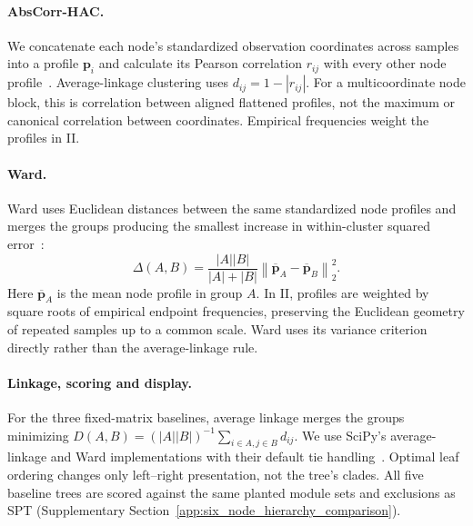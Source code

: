 \documentclass[fleqn,10pt]{wlscirep}
\begin{document}
\paragraph{AbsCorr-HAC.}
\label{app:absolute_correlation}
We concatenate each node's standardized observation coordinates across samples into a profile $\boldsymbol{p}_i$ and calculate its Pearson correlation $r_{ij}$ with every other node profile~\cite{deHoon2004OpenSourceClustering}. Average-linkage clustering uses $d_{ij}=1-|r_{ij}|$. For a multicoordinate node block, this is correlation between aligned flattened profiles, not the maximum or canonical correlation between coordinates. Empirical frequencies weight the profiles in II.


\paragraph{Ward.}
\label{app:ward}
Ward uses Euclidean distances between the same standardized node profiles and merges the groups producing the smallest increase in within-cluster squared error~\cite{Ward1963HierarchicalGrouping}:
\begingroup
\begin{equation}
\Delta(A,B)=\frac{|A||B|}{|A|+|B|}
\left\|\overline{\boldsymbol{p}}_A-\overline{\boldsymbol{p}}_B\right\|_2^2.
\end{equation}
\endgroup
Here $\overline{\boldsymbol{p}}_A$ is the mean node profile in group $A$. In II, profiles are weighted by square roots of empirical endpoint frequencies, preserving the Euclidean geometry of repeated samples up to a common scale. Ward uses its variance criterion directly rather than the average-linkage rule.

\paragraph{Linkage, scoring and display.}
For the three fixed-matrix baselines, average linkage merges the groups minimizing $D(A,B)=(|A||B|)^{-1}\sum_{i\in A,j\in B}d_{ij}$. We use SciPy's average-linkage and Ward implementations with their default tie handling~\cite{Mullner2011Hierarchical,Virtanen2020SciPy}. Optimal leaf ordering changes only left--right presentation, not the tree's clades. All five baseline trees are scored against the same planted module sets and exclusions as SPT (Supplementary Section~\ref{app:six_node_hierarchy_comparison}).


\end{document}
